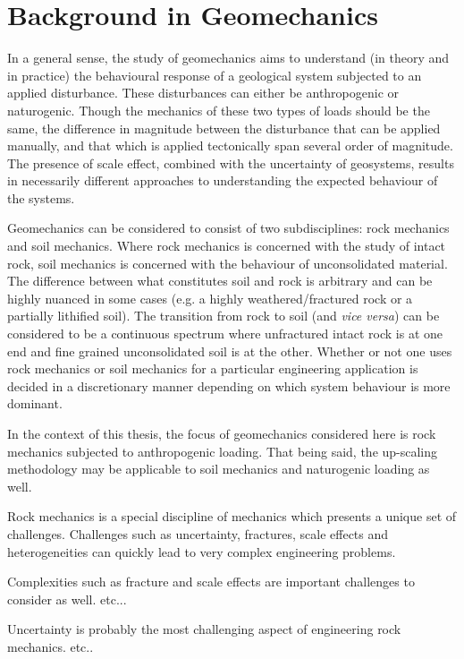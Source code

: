 \chapter{Background in Geomechanics}
In a general sense, the study of geomechanics aims to understand (in theory and in practice) the behavioural response of a geological system subjected to an applied disturbance. These disturbances can either be anthropogenic or naturogenic. Though the mechanics of these two types of loads should be the same, the difference in magnitude between the disturbance that can be applied manually, and that which is applied tectonically span several order of magnitude. The presence of scale effect, combined with the uncertainty of geosystems, results in necessarily different approaches to understanding the expected behaviour of the systems. 

Geomechanics can be considered to consist of two subdisciplines: rock mechanics and soil mechanics. Where rock mechanics is concerned with the study of intact rock, soil mechanics is concerned with the behaviour of unconsolidated material. The difference between what constitutes soil and rock is arbitrary and can be highly nuanced in some cases (e.g. a highly weathered/fractured rock or a partially lithified soil). The transition from rock to soil (and \textit{vice versa}) can be considered to be a continuous spectrum where unfractured intact rock is at one end and fine grained unconsolidated soil is at the other. Whether or not one uses rock mechanics or soil mechanics for a particular engineering application is decided in a discretionary manner depending on which system behaviour is more dominant.

In the context of this thesis, the focus of geomechanics considered here is rock mechanics subjected to anthropogenic loading. That being said, the up-scaling methodology may be applicable to soil mechanics and naturogenic loading as well.  

Rock mechanics is a special discipline of mechanics which presents a unique set of challenges. Challenges such as uncertainty, fractures, scale effects and heterogeneities can quickly lead to very complex engineering problems. 

Complexities such as fracture and scale effects are important challenges to consider as well. etc...

Uncertainty is probably the most challenging aspect of engineering rock mechanics. etc..

